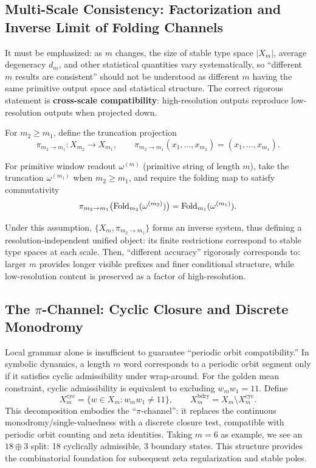 \subsection{Multi-Scale Consistency: Factorization and Inverse Limit of Folding Channels}

It must be emphasized: as $m$ changes, the size of stable type space $|X_m|$, average degeneracy $d_m$, and other statistical quantities vary systematically, so ``different $m$ results are consistent'' should not be understood as different $m$ having the same primitive output space and statistical structure. The correct rigorous statement is \textbf{cross-scale compatibility}: high-resolution outputs reproduce low-resolution outputs when projected down.

\begin{definition}\label{def:resfold-pi}
For $m_2\ge m_1$, define the truncation projection
\[
\pi_{m_2\to m_1}:X_{m_2}\to X_{m_1},\qquad
\pi_{m_2\to m_1}(x_1,\dots,x_{m_2})=(x_1,\dots,x_{m_1}).
\]
\end{definition}

\begin{assumption}\label{assump:resfold-factorization}
For primitive window readout $\omega^{(m)}$ (primitive string of length $m$), take the truncation $\omega^{(m_1)}$ when $m_2\ge m_1$, and require the folding map to satisfy commutativity
\[
\pi_{m_2\to m_1}\bigl(\mathrm{Fold}_{m_2}(\omega^{(m_2)})\bigr)=\mathrm{Fold}_{m_1}(\omega^{(m_1)}).
\]
\end{assumption}

Under this assumption, $\{X_m,\pi_{m_2\to m_1}\}$ forms an inverse system, thus defining a resolution-independent unified object: its finite restrictions correspond to stable type spaces at each scale. Then, ``different accuracy'' rigorously corresponds to: larger $m$ provides longer visible prefixes and finer conditional structure, while low-resolution content is preserved as a factor of high-resolution.

\subsection{The $\pi$-Channel: Cyclic Closure and Discrete Monodromy}

Local grammar alone is insufficient to guarantee ``periodic orbit compatibility.'' In symbolic dynamics, a length $m$ word corresponds to a periodic orbit segment only if it satisfies cyclic admissibility under wrap-around. For the golden mean constraint, cyclic admissibility is equivalent to excluding $w_mw_1=11$. Define
\[
X_m^{\mathrm{cyc}}=\{w\in X_m: w_mw_1\neq 11\},\qquad
X_m^{\mathrm{bdry}}=X_m\setminus X_m^{\mathrm{cyc}}.
\]
This decomposition embodies the ``$\pi$-channel'': it replaces the continuous monodromy/single-valuedness with a discrete closure test, compatible with periodic orbit counting and zeta identities. Taking $m=6$ as example, we see an $18\oplus 3$ split: 18 cyclically admissible, 3 boundary states. This structure provides the combinatorial foundation for subsequent zeta regularization and stable poles.

